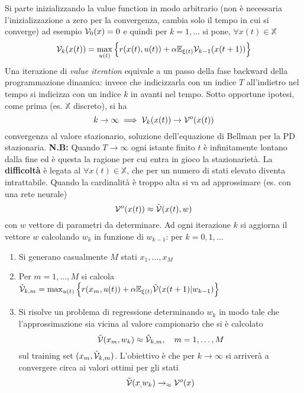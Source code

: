 Si parte inizializzando la value function in modo arbitrario (non \`e necessaria l'inizializzazione a zero per la convergenza, cambia solo il tempo in cui si converge) ad esempio $\mathcal{V}_0(x) = 0$ e quindi per $k=1, \dots$ si pone, $\forall x(t) \in \mathbb{X}$
\begin{equation}
\mathcal{V}_k(x(t)) = \max_{u(t)} \Big \{ r(x(t),u(t)) + \alpha \mathbb{E}_{\xi(t)} \mathcal{V}_{k-1}(x(t+1)) \Big \}
\end{equation} Una iterazione di \textit{value iteration} equivale a un passo della fase backward della programmazione dinamica: invece che indicizzarla con un indice $T$ all'indietro nel tempo si indicizza con un indice $k$ in avanti nel tempo. Sotto opportune ipotesi, come prima (es. $\mathbb{X}$ discreto), si ha
\begin{equation}
k \to \infty \implies \mathcal{V}_k(x(t)) \to \mathcal{V}^o(x(t))
\end{equation} convergenza al valore stazionario, soluzione dell'equazione di Bellman per la PD stazionaria.
\textbf{N.B:} Quando $T \to \infty$ ogni istante finito $t$ \`e infinitamente lontano dalla fine ed \`e questa la ragione per cui entra in gioco la stazionariet\`a. La \textbf{difficolt\`a} \`e legata al $\forall x(t) \in \mathbb{X}$, che per un numero di stati elevato diventa intrattabile. Quando la cardinalit\`a \`e troppo alta si va ad approssimare (es. con una rete neurale)
\begin{equation}
\mathcal{V}^o(x(t)) \approx \tilde{\mathcal{V}}(x(t),w)
\end{equation} con $w$ vettore di parametri da determinare. Ad ogni iterazione $k$ si aggiorna il vettore $w$ calcolando $w_k$ in funzione di $w_{k-1}$: per $k=0,1,\dots$
\begin{enumerate}
\item Si generano casualmente $M$ stati $x_1, \dots, x_M$
\item Per $m=1,\dots,M$ si calcola $\hat{\mathcal{V}}_{k,m} = \max_{u(t)} \Big \{ r(x_m, u(t)) + \alpha \mathbb{E}_{\xi(t)} \tilde{\mathcal{V}}(x(t+1)|w_{k-1}) \Big \} $
\item Si risolve un problema di regressione determinando $w_k$ in modo tale che l'approssimazione sia vicina al valore campionario che si \`e calcolato
    \begin{equation}
    \tilde{\mathcal{V}}(x_m, w_k) \approx \hat{\mathcal{V}}_{k,m}, \quad m=1,\dots,M
    \end{equation} sul training set $(x_m, \hat{\mathcal{V}}_{k,m})$. L'obiettivo \`e che per $k \to \infty$ si arriver\`a a convergere circa ai valori ottimi per gli stati
    \begin{equation}
    \tilde{\mathcal{V}}(x_, w_k) \to_\approx \mathcal{V}^o(x)
    \end{equation}
\end{enumerate}

